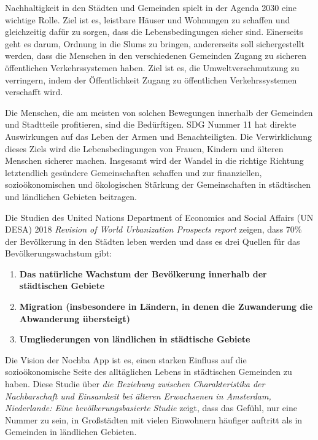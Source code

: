 Nachhaltigkeit in den Städten und Gemeinden spielt in der Agenda 2030 eine wichtige Rolle. Ziel ist es, leistbare Häuser und Wohnungen zu schaffen und gleichzeitig dafür zu sorgen, dass die Lebensbedingungen sicher sind. Einerseits geht es darum, Ordnung in die Slums zu bringen, andererseits soll sichergestellt werden, dass die Menschen in den verschiedenen Gemeinden Zugang zu sicheren öffentlichen Verkehrssystemen haben. Ziel ist es, die Umweltverschmutzung zu verringern, indem der Öffentlichkeit Zugang zu öffentlichen Verkehrssystemen verschafft wird.

Die Menschen, die am meisten von solchen Bewegungen innerhalb der Gemeinden und Stadtteile profitieren, sind die Bedürftigen. SDG Nummer 11 hat direkte Auswirkungen auf das Leben der Armen und Benachteiligten. Die Verwirklichung dieses Ziels wird die Lebensbedingungen von Frauen, Kindern und älteren Menschen sicherer machen. Insgesamt wird der Wandel in die richtige Richtung letztendlich gesündere Gemeinschaften schaffen und zur finanziellen, sozioökonomischen und ökologischen Stärkung der Gemeinschaften in städtischen und ländlichen Gebieten beitragen.

Die Studien des United Nations Department of Economics and Social Affairs (UN DESA) 2018 \textit{Revision of World Urbanization Prospects report} \cite{Worlds-Urbanization-Prospects} zeigen, dass 70\% der Bevölkerung in den Städten leben werden und dass es drei Quellen für das Bevölkerungswachstum gibt:

\begin{enumerate}
    \item \textbf{Das natürliche Wachstum der Bevölkerung innerhalb der städtischen Gebiete}
    \item \textbf{Migration (insbesondere in Ländern, in denen die Zuwanderung die Abwanderung übersteigt)}
    \item \textbf{Umgliederungen von ländlichen in städtische Gebiete}
\end{enumerate}

Die Vision der Nochba App ist es, einen starken Einfluss auf die sozioökonomische Seite des alltäglichen Lebens in städtischen Gemeinden zu haben. Diese Studie über \textit{die Beziehung zwischen Charakteristika der Nachbarschaft und Einsamkeit bei älteren Erwachsenen in Amsterdam, Niederlande: Eine bevölkerungsbasierte Studie} \cite{neighbourhood-characteristics-and-loneliness} zeigt, dass das Gefühl, nur eine Nummer zu sein, in Großstädten mit vielen Einwohnern häufiger auftritt als in Gemeinden in ländlichen Gebieten.

